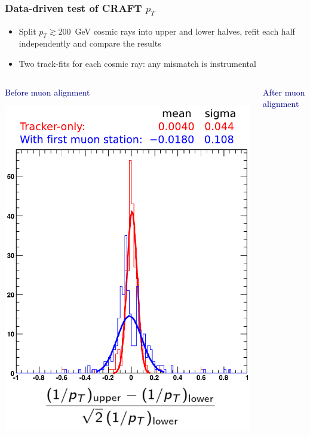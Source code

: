 \documentclass[compress]{beamer}
\begin{document}
\begin{frame}
\frametitle{Data-driven test of CRAFT $p_T$}

\begin{itemize}
\item Split $p_T \gtrsim 200$~GeV cosmic rays into upper and lower halves, refit each half independently and compare the results
\item Two track-fits for each cosmic ray: any mismatch is instrumental
\end{itemize}

\vspace{-0.5 cm}
\begin{columns}
\begin{center}
\textcolor{darkblue}{Before muon alignment}

\includegraphics[width=0.9\linewidth]{without_alignment.pdf}
\end{center}
\begin{center}
\textcolor{darkblue}{After muon alignment}


\end{center}
\end{columns}
\end{frame}
\end{document}
